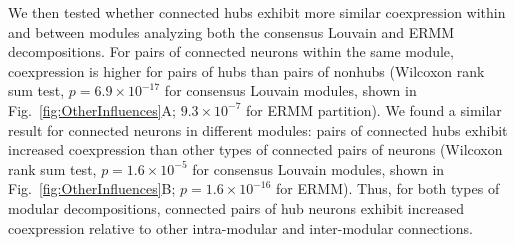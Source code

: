 \documentclass[10pt,letterpaper]{article}
\begin{document}
{%
We then tested whether connected hubs exhibit more similar coexpression within and between modules analyzing both the consensus Louvain and ERMM decompositions.
For pairs of connected neurons within the same module, coexpression is higher for pairs of hubs than pairs of nonhubs (Wilcoxon rank sum test, $p = 6.9\times 10^{-17}$ for consensus Louvain modules, shown in Fig.~\ref{fig:OtherInfluences}A; $9.3 \times 10^{-7}$ for ERMM partition).
We found a similar result for connected neurons in different modules: pairs of connected hubs exhibit increased coexpression than other types of connected pairs of neurons (Wilcoxon rank sum test, $p = 1.6 \times 10^{-5}$ for consensus Louvain modules, shown in Fig.~\ref{fig:OtherInfluences}B; $p = 1.6 \times 10^{-16}$ for ERMM).
Thus, for both types of modular decompositions, connected pairs of hub neurons exhibit increased coexpression relative to other intra-modular and inter-modular connections.

}
\end{document}
